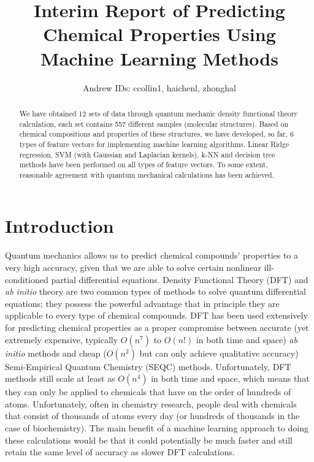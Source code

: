 \documentclass[12pt, oneside]{article}   	%
\title{Interim Report of Predicting Chemical Properties Using Machine Learning Methods}
\author{Andrew IDs: ccollin1, haichenl, zhonghal}
\begin{document}
\maketitle

\begin{abstract}
We have obtained 12 sets of data through quantum mechanic density functional theory calculation, each set contains 557 different samples (molecular structures). Based on chemical compositions and properties of these structures, we have developed, so far, 6 types of feature vectors for implementing machine learning algorithms. Linear Ridge regression, SVM (with Gaussian and Laplacian kernels), k-NN and decision tree methods have been performed on all types of feature vectors. To some extent, reasonable agreement with quantum mechanical calculations has been achieved.    
\end{abstract}
\section{Introduction}
\noindent Quantum mechanics allows us to predict chemical compounds' properties to a very high accuracy, given that we are able to solve certain nonlinear ill-conditioned partial differential equations. Density Functional Theory (DFT) and \textit{ab initio} theory are two common types of methods to solve quantum differential equations; they possess the powerful advantage that in principle they are applicable to every type of chemical compounds. DFT has been used extensively for predicting chemical properties as a proper compromise between accurate (yet extremely expensive, typically $O(n^7)$ to $O(n!)$ in both time and space) \textit{ab initio} methods and cheap ($O(n^2)$ but can only achieve qualitative accuracy) Semi-Empirical Quantum Chemistry (SEQC) methods. Unfortunately, DFT methods still scale at least as $O(n^4)$ in both time and space, which means that they can only be applied to chemicals that have on the order of hundreds of atoms. Unfortunately, often in chemistry research, people deal with chemicals that consist of thousands of atoms every day (or hundreds of thousands in the case of biochemistry). The main benefit of a machine learning approach to doing these calculations would be that it could potentially be much faster and still retain the same level of accuracy as slower DFT calculations.
\end{document}
